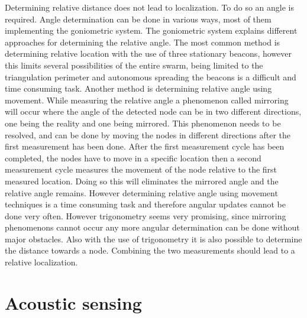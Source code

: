 \documentclass[10pt,a4paper]{article}
\begin{document}
Determining relative distance does not lead to localization. To do so an angle is required. Angle determination can be done in various ways, most of them implementing the goniometric system. The goniometric system explains different approaches for determining the relative angle. The most common method is determining relative location with the use of three stationary beacons, however this limits several possibilities of the entire swarm, being limited to the triangulation perimeter and autonomous spreading the beacons is a difficult and time consuming task.
Another method is determining relative angle using movement. While measuring the relative angle a phenomenon called mirroring will occur where the angle of the detected node can be in two different directions, one being the reality and one being mirrored. This phenomenon needs to be resolved, and can be done by moving the nodes in different directions after the first measurement has been done. After the first measurement cycle has been completed, the nodes have to move in a specific location then a second measurement cycle measures the movement of the node relative to the first measured location. Doing so this will eliminates the mirrored angle and the relative angle remains. However determining relative angle using movement techniques is a time consuming task and therefore angular updates cannot be done very often.
However trigonometry seems very promising, since mirroring phenomenons cannot occur any more angular determination can be done without major obstacles. Also with the use of trigonometry it is also possible to determine the distance towards a node. Combining the two measurements should lead to a relative localization.

\newpage

\section{Acoustic sensing}
\end{document}
